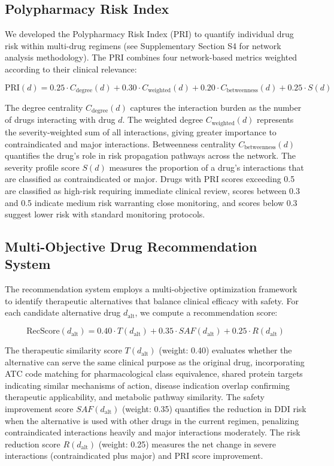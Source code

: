 \documentclass[11pt,a4paper]{article}
\begin{document}
\subsection*{Polypharmacy Risk Index}

We developed the Polypharmacy Risk Index (PRI) to quantify individual drug risk within multi-drug regimens (see Supplementary Section S4 for network analysis methodology). The PRI combines four network-based metrics weighted according to their clinical relevance:

\begin{equation}
\text{PRI}(d) = 0.25 \cdot C_{\text{degree}}(d) + 0.30 \cdot C_{\text{weighted}}(d) + 0.20 \cdot C_{\text{betweenness}}(d) + 0.25 \cdot S(d)
\end{equation}

The degree centrality $C_{\text{degree}}(d)$ captures the interaction burden as the number of drugs interacting with drug $d$. The weighted degree $C_{\text{weighted}}(d)$ represents the severity-weighted sum of all interactions, giving greater importance to contraindicated and major interactions. Betweenness centrality $C_{\text{betweenness}}(d)$ quantifies the drug's role in risk propagation pathways across the network. The severity profile score $S(d)$ measures the proportion of a drug's interactions that are classified as contraindicated or major. Drugs with PRI scores exceeding 0.5 are classified as high-risk requiring immediate clinical review, scores between 0.3 and 0.5 indicate medium risk warranting close monitoring, and scores below 0.3 suggest lower risk with standard monitoring protocols.

\subsection*{Multi-Objective Drug Recommendation System}

The recommendation system employs a multi-objective optimization framework to identify therapeutic alternatives that balance clinical efficacy with safety. For each candidate alternative drug $d_{\text{alt}}$, we compute a recommendation score:

\begin{equation}
\text{RecScore}(d_{\text{alt}}) = 0.40 \cdot T(d_{\text{alt}}) + 0.35 \cdot SAF(d_{\text{alt}}) + 0.25 \cdot R(d_{\text{alt}})
\end{equation}

The therapeutic similarity score $T(d_{\text{alt}})$ (weight: 0.40) evaluates whether the alternative can serve the same clinical purpose as the original drug, incorporating ATC code matching for pharmacological class equivalence, shared protein targets indicating similar mechanisms of action, disease indication overlap confirming therapeutic applicability, and metabolic pathway similarity. The safety improvement score $SAF(d_{\text{alt}})$ (weight: 0.35) quantifies the reduction in DDI risk when the alternative is used with other drugs in the current regimen, penalizing contraindicated interactions heavily and major interactions moderately. The risk reduction score $R(d_{\text{alt}})$ (weight: 0.25) measures the net change in severe interactions (contraindicated plus major) and PRI score improvement.
\end{document}
